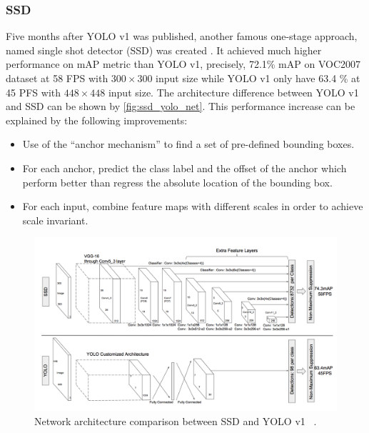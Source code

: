 \subsubsection{SSD}

Five months after YOLO v1 was published, another famous one-stage approach,
named single shot detector (SSD) was created \cite{ssd-paper-2015}. 
It achieved much higher performance on mAP metric than YOLO v1, precisely, 
72.1\% mAP on VOC2007 dataset at 58 FPS with $300 \times 300$ input size while 
YOLO v1 only have 63.4 \% at 45 PFS with
$448 \times 448$ input size. The architecture difference between YOLO v1 and 
SSD can be shown by \autoref{fig:ssd_yolo_net}.
This performance increase can be explained by the following improvements:

\begin{itemize}
    \item Use of the ``anchor mechanism'' to find a set of pre-defined bounding boxes.

    \item For each anchor, predict the class label and the offset of the
    anchor which perform better than regress the absolute location of the 
    bounding box.

	\item For each input, combine feature maps with different scales in order to
    achieve scale invariant.
\end{itemize}

\begin{figure}
    \includegraphics[width=\linewidth]{figures/ssd_yolo_net_arch.png}
    \caption{Network architecture comparison between SSD and YOLO v1
    ~\protect\cite{ssd-paper-2015}.}
    \label{fig:ssd_yolo_net}
\end{figure}

